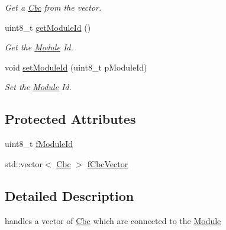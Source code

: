 \begin{DoxyCompactItemize}
\begin{DoxyCompactList}\small\item\em Get a \hyperlink{class_ph2___hw_description_1_1_cbc}{Cbc} from the vector. \end{DoxyCompactList}\item 
uint8\-\_\-t \hyperlink{class_ph2___hw_description_1_1_module_ac0a90348d8b8dfb1bbb7cfb3aec81822}{get\-Module\-Id} ()
\begin{DoxyCompactList}\small\item\em Get the \hyperlink{class_ph2___hw_description_1_1_module}{Module} Id. \end{DoxyCompactList}\item 
void \hyperlink{class_ph2___hw_description_1_1_module_a4f404f856fdfd3af1459cf47baab1a51}{set\-Module\-Id} (uint8\-\_\-t p\-Module\-Id)
\begin{DoxyCompactList}\small\item\em Set the \hyperlink{class_ph2___hw_description_1_1_module}{Module} Id. \end{DoxyCompactList}\end{DoxyCompactItemize}
\subsection*{Protected Attributes}
\begin{DoxyCompactItemize}
\item 
uint8\-\_\-t \hyperlink{class_ph2___hw_description_1_1_module_a8bf42ae708d304acbc5509edf7f7cee0}{f\-Module\-Id}
\item 
std\-::vector$<$ \hyperlink{class_ph2___hw_description_1_1_cbc}{Cbc} $>$ \hyperlink{class_ph2___hw_description_1_1_module_ab5cfd93bf927592f609d31f66cd4161b}{f\-Cbc\-Vector}
\end{DoxyCompactItemize}


\subsection{Detailed Description}
handles a vector of \hyperlink{class_ph2___hw_description_1_1_cbc}{Cbc} which are connected to the \hyperlink{class_ph2___hw_description_1_1_module}{Module} 

